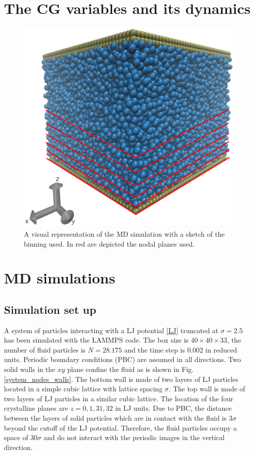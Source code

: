 \documentclass[a4paper,openright,12pt]{book}
\begin{document}
\section{The CG variables and its dynamics}
\begin{figure}
    \centering
    \includegraphics[scale=0.3]{system_nodes_walls}
    \caption[Walls box]{A visual representation of the MD simulation with a sketch of the binning used. In red are depicted the nodal planes used.}
    \label{fig:WallsBox}
\end{figure}


\section{MD simulations}
\label{Sec:SimWALLS}
\subsection{Simulation set up}
A system of particles interacting  with a LJ potential \ref{LJ}
truncated at $\sigma=2.5$ has been simulated with the LAMMPS code. The
box size  is $40\times40\times33$,  the number  of fluid  particles is
$N=28.175$ and  the time step  is $0.002$ in reduced  units.  Periodic
boundary conditions  (PBC) are assumed  in all directions.   Two solid
walls in the $xy$ plane confine the fluid as is shown in Fig. \ref{system_nodes_walls}.  The bottom wall is made of
two layers  of LJ  particles located  in a  simple cubic  lattice with
lattice spacing  $\sigma$. The top  wall is made  of two layers  of LJ
particles  in a  similar  cubic  lattice.  The  location  of the  four
crystalline planes  are $z=0,1,31,32$  in LJ units.   Due to  PBC, the
distance between  the layers of  solid particles which are  in contact
with   the  fluid   is  $3\sigma$   beyond  the   cutoff  of   the  LJ
potential. Therefore, the fluid particles occupy a space of $30\sigma$
and  do  not  interact  with  the  periodic  images  in  the  vertical
direction.
\end{document}
